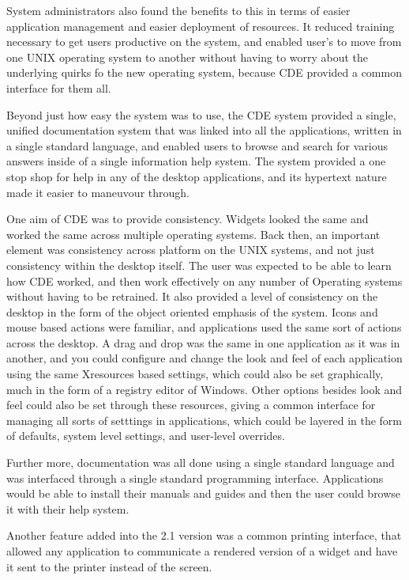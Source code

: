 System administrators also found the benefits to this in terms of easier
application management and easier deployment of resources. It reduced
training necessary to get users productive on the system, and enabled
user's to move from one UNIX operating system to another without having
to worry about the underlying quirks fo the new operating system,
because CDE provided a common interface for them all. 

Beyond just how easy the system was to use, the CDE system provided a
single, unified documentation system that was linked into all the
applications, written in a single standard language, and enabled users
to browse and search for various answers inside of a single information
help system. The system provided a one stop shop for help in any of the
desktop applications, and its hypertext nature made it easier to
maneuvour through.

One aim of CDE was to provide consistency. Widgets looked the same and
worked the same across multiple operating systems. Back then, an
important element was consistency across platform on the UNIX systems,
and not just consistency within the desktop itself. The user was
expected to be able to learn how CDE worked, and then work effectively
on any number of Operating systems without having to be retrained.
It also provided a level of consistency on the desktop in the form of
the object oriented emphasis of the system. Icons and mouse based
actions were familiar, and applications used the same sort of actions
across the desktop. A drag and drop was the same in one application as
it was in another, and you could configure and change the look and feel
of each application using the same Xresources based settings, which
could also be set graphically, much in the form of a registry editor of
Windows. Other options besides look and feel could also be set through
these resources, giving a common interface for managing all sorts of
setttings in applications, which could be layered in the form of
defaults, system level settings, and user-level overrides. 

Further more, documentation was all done using a single standard
language and was interfaced through a single standard programming
interface. Applications would be able to install their manuals and
guides and then the user could browse it with their help system. 

Another feature added into the 2.1 version was a common printing
interface, that allowed any application to communicate a rendered version
of a widget and have it sent to the printer instead of the screen.

